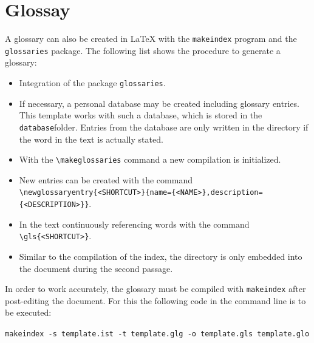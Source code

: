 
\section{Glossay}
\label{sec:instructions_glossay}

A glossary can also be created in \LaTeX{} with the \texttt{makeindex} program and the \texttt{glossaries} package. The following list shows the procedure to generate a glossary:

\begin{itemize}
	\item Integration of the package \texttt{glossaries}.
	\item If necessary, a personal database may be created including glossary entries. This template works with such a database, which is stored in the \texttt{database}folder. Entries from the database are only written in the directory if the word in the text is actually stated.
	\item With the \texttt{\textbackslash makeglossaries} command a new compilation is initialized.
	\item New entries can be created with the command \\ \texttt{\textbackslash newglossaryentry\{<SHORTCUT>\}\{name=\{<NAME>\},description=\{<DESCRIPTION>\}\}}.
	\item In the text continuously referencing words with the command \texttt{\textbackslash gls\{<SHORTCUT>\}}.
	\item Similar to the compilation of the index, the directory is only embedded into the document  during the second passage.
\end{itemize}

In order to work accurately, the glossary must be compiled with \texttt{makeindex} after post-editing the document. For this the following code in the command line is to be executed:

\begin{center}
	\texttt{makeindex -s template.ist -t template.glg -o template.gls template.glo}
\end{center}

